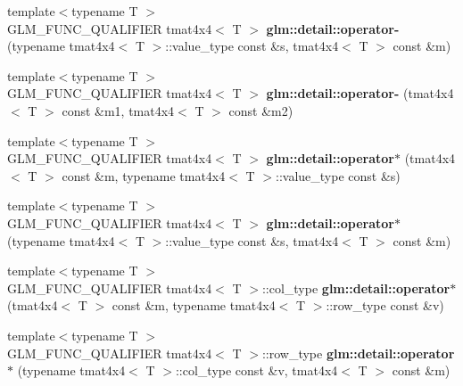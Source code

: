 \begin{DoxyCompactItemize}
\item 
\hypertarget{namespaceglm_1_1detail_ab8c37ba8caa7eacee94c69505f3d3670}{}{\footnotesize template$<$typename T $>$ }\\G\+L\+M\+\_\+\+F\+U\+N\+C\+\_\+\+Q\+U\+A\+L\+I\+F\+I\+E\+R tmat4x4$<$ T $>$ {\bfseries glm\+::detail\+::operator-\/} (typename tmat4x4$<$ T $>$\+::value\+\_\+type const \&s, tmat4x4$<$ T $>$ const \&m)\label{namespaceglm_1_1detail_ab8c37ba8caa7eacee94c69505f3d3670}

\item 
\hypertarget{namespaceglm_1_1detail_a39935cfee0b8b63f8c1716058e8faedb}{}{\footnotesize template$<$typename T $>$ }\\G\+L\+M\+\_\+\+F\+U\+N\+C\+\_\+\+Q\+U\+A\+L\+I\+F\+I\+E\+R tmat4x4$<$ T $>$ {\bfseries glm\+::detail\+::operator-\/} (tmat4x4$<$ T $>$ const \&m1, tmat4x4$<$ T $>$ const \&m2)\label{namespaceglm_1_1detail_a39935cfee0b8b63f8c1716058e8faedb}

\item 
\hypertarget{namespaceglm_1_1detail_ace2530d9d1d3fc7ac4e2a76d65467fed}{}{\footnotesize template$<$typename T $>$ }\\G\+L\+M\+\_\+\+F\+U\+N\+C\+\_\+\+Q\+U\+A\+L\+I\+F\+I\+E\+R tmat4x4$<$ T $>$ {\bfseries glm\+::detail\+::operator$\ast$} (tmat4x4$<$ T $>$ const \&m, typename tmat4x4$<$ T $>$\+::value\+\_\+type const \&s)\label{namespaceglm_1_1detail_ace2530d9d1d3fc7ac4e2a76d65467fed}

\item 
\hypertarget{namespaceglm_1_1detail_ab15a8b6c9206f93b74611f82cc77a95a}{}{\footnotesize template$<$typename T $>$ }\\G\+L\+M\+\_\+\+F\+U\+N\+C\+\_\+\+Q\+U\+A\+L\+I\+F\+I\+E\+R tmat4x4$<$ T $>$ {\bfseries glm\+::detail\+::operator$\ast$} (typename tmat4x4$<$ T $>$\+::value\+\_\+type const \&s, tmat4x4$<$ T $>$ const \&m)\label{namespaceglm_1_1detail_ab15a8b6c9206f93b74611f82cc77a95a}

\item 
\hypertarget{namespaceglm_1_1detail_af97a2dc9dc200c8b81fec29178dbcfbc}{}{\footnotesize template$<$typename T $>$ }\\G\+L\+M\+\_\+\+F\+U\+N\+C\+\_\+\+Q\+U\+A\+L\+I\+F\+I\+E\+R tmat4x4$<$ T $>$\+::col\+\_\+type {\bfseries glm\+::detail\+::operator$\ast$} (tmat4x4$<$ T $>$ const \&m, typename tmat4x4$<$ T $>$\+::row\+\_\+type const \&v)\label{namespaceglm_1_1detail_af97a2dc9dc200c8b81fec29178dbcfbc}

\item 
\hypertarget{namespaceglm_1_1detail_a4efac78463573bd8560b6a1d939c5664}{}{\footnotesize template$<$typename T $>$ }\\G\+L\+M\+\_\+\+F\+U\+N\+C\+\_\+\+Q\+U\+A\+L\+I\+F\+I\+E\+R tmat4x4$<$ T $>$\+::row\+\_\+type {\bfseries glm\+::detail\+::operator$\ast$} (typename tmat4x4$<$ T $>$\+::col\+\_\+type const \&v, tmat4x4$<$ T $>$ const \&m)\label{namespaceglm_1_1detail_a4efac78463573bd8560b6a1d939c5664}


\end{DoxyCompactItemize}
